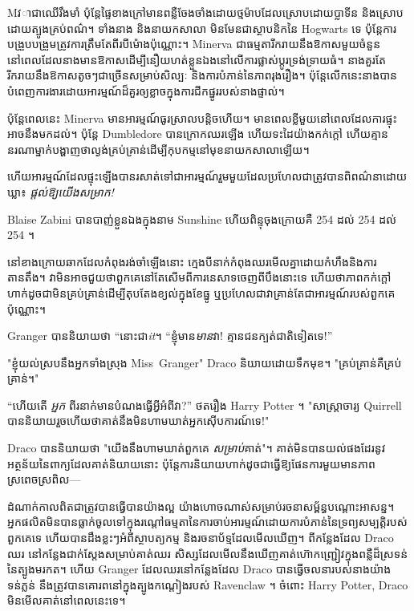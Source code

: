 
\lettrine{M} វា​ជា​ឈើ​រឹង​មាំ ប៉ុន្តែ​ផ្ទៃ​ខាង​ក្រៅ​មាន​ពន្លឺ​ចែងចាំង​ដោយ​ថ្មម៉ាប​ដែល​ស្រោប​ដោយ​ប្លាទីន និង​ស្រោប​ដោយ​ត្បូង​គ្រប់​ពណ៌។ ទាំងនាង និងនាយកសាលា មិនមែនជាស្ថាបនិកនៃ Hogwarts ទេ ប៉ុន្តែការបង្រួបបង្រួមត្រូវការត្រឹមតែពីរបីម៉ោងប៉ុណ្ណោះ។ Minerva ជាធម្មតារីករាយនឹងឱកាសមួយចំនួននៅពេលដែលនាងមានឱកាសដើម្បីនឿយហត់ខ្លួនឯងនៅលើការផ្លាស់ប្តូរទ្រង់ទ្រាយធំ។ នាងគួរតែរីករាយនឹងឱកាសតូចៗជាច្រើនសម្រាប់សិល្បៈ និងការបំភាន់នៃភាពរុងរឿង។ ប៉ុន្តែ​លើក​នេះ​នាង​បាន​បំពេញ​ការងារ​ដោយ​អារម្មណ៍​ដ៏​គួរ​ឲ្យ​ខ្លាច​ក្នុង​ការ​ជីក​ផ្នូរ​របស់​នាង​ផ្ទាល់។

ប៉ុន្តែពេលនេះ Minerva មានអារម្មណ៍ធូរស្រាលបន្តិចហើយ។ មានពេលខ្លីមួយនៅពេលដែលការផ្ទុះអាចនឹងមកដល់។ ប៉ុន្តែ Dumbledore បានក្រោកឈរឡើង ហើយទះដៃយ៉ាងកក់ក្តៅ ហើយគ្មាននរណាម្នាក់បង្ហាញថាល្ងង់គ្រប់គ្រាន់ដើម្បីកុបកម្មនៅមុខនាយកសាលាឡើយ។

ហើយ​អារម្មណ៍​ដែល​ផ្ទុះ​ឡើង​បាន​រសាត់​ទៅ​ជា​អារម្មណ៍​រួម​មួយ​ដែល​ប្រហែល​ជា​ត្រូវ​បាន​ពិពណ៌នា​ដោយ​ឃ្លា៖ \emph{ផ្តល់ឱ្យ​យើង​សម្រាក!}

Blaise Zabini បានបាញ់ខ្លួនឯងក្នុងនាម Sunshine ហើយពិន្ទុចុងក្រោយគឺ 254 ដល់ 254 ដល់ 254 ។

\later

នៅ​ខាងក្រោយ​ឆាក​ដែល​កំពុង​រង់ចាំ​ឡើង​នោះ ក្មេង​បី​នាក់​កំពុង​ឈរ​មើល​គ្នា​ដោយ​កំហឹង​និង​ការ​តានតឹង។ វាមិនអាចជួយថាពួកគេនៅតែសើមពីការនេសាទចេញពីបឹងនោះទេ ហើយថាភាពកក់ក្តៅហាក់ដូចជាមិនគ្រប់គ្រាន់ដើម្បីតុបតែងខ្យល់ក្នុងខែធ្នូ ឬប្រហែលជាវាគ្រាន់តែជាអារម្មណ៍របស់ពួកគេប៉ុណ្ណោះ។

Granger បាននិយាយថា “នោះជា\emph{it}។ “ខ្ញុំមាន\emph{មាន}វា! គ្មានជនក្បត់ជាតិទៀតទេ!”

"ខ្ញុំយល់ស្របនឹងអ្នកទាំងស្រុង Miss~Granger" Draco និយាយដោយទឹកមុខ។ "គ្រប់គ្រាន់គឺគ្រប់គ្រាន់។"

“ហើយតើ \emph{អ្នក} ពីរនាក់មានបំណងធ្វើអ្វីអំពីវា?” ថតរឿង Harry Potter ។ "សាស្រ្តាចារ្យ Quirrell បាននិយាយរួចហើយថាគាត់នឹងមិនហាមឃាត់អ្នកស៊ើបការណ៍ទេ!"

Draco បាននិយាយថា "យើងនឹងហាមឃាត់ពួកគេ \emph{សម្រាប់}គាត់"។ គាត់​មិន​បាន​យល់​ផង​ដែរ​នូវ​អត្ថន័យ​នៃ​ពាក្យ​ដែល​គាត់​និយាយ​នោះ ប៉ុន្តែ​ការ​និយាយ​ហាក់​ដូច​ជា​ធ្វើ​ឱ្យ​ផែនការ​មួយ​មាន​ភាព​ស្រពេចស្រពិល—

\later

ដំណាក់កាលពិតជាត្រូវបានធ្វើបានយ៉ាងល្អ យ៉ាងហោចណាស់សម្រាប់រចនាសម្ព័ន្ធបណ្តោះអាសន្ន។ អ្នកផលិតមិនបានធ្លាក់ចូលទៅក្នុងរណ្តៅធម្មតានៃការចាប់អារម្មណ៍ដោយការបំភាន់នៃទ្រព្យសម្បត្តិរបស់ពួកគេទេ ហើយបានដឹងខ្លះៗអំពីស្ថាបត្យកម្ម និងរចនាប័ទ្មដែលមើលឃើញ។ ពីកន្លែងដែល Draco ឈរ នៅកន្លែងជាក់ស្តែងសម្រាប់គាត់ឈរ សិស្សដែលមើលនឹងឃើញគាត់ហ៊ោកញ្ជ្រៀវក្នុងពន្លឺដ៏ស្រទន់នៃត្បូងមរកត។ ហើយ Granger ដែលឈរនៅកន្លែងដែល Draco បានធ្វើចលនារបស់នាងយ៉ាងទន់ភ្លន់ នឹងត្រូវបានគោរពនៅក្នុងត្បូងកណ្តៀងរបស់ Ravenclaw ។ ចំពោះ Harry Potter, Draco មិនមើលគាត់នៅពេលនេះទេ។


